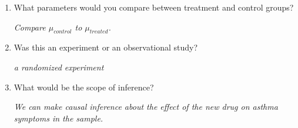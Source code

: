 \begin{enumerate}
\begin{enumerate}
    \item What parameters would you compare between treatment and
      control groups?
\begin{students}
        \vfill
\end{students}
\begin{key}
 {\it Compare $\mu_{control}$ to $\mu_{treated}$.}
\end{key}

    \item Was this  an experiment or an observational study? 
\begin{students}
        \vfill
\end{students}
\begin{key}
 {\it a randomized experiment}
\end{key}

    \item What would be the scope of inference?
 \begin{students}
        \vfill
\end{students}
\begin{key}
 {\it We can make causal inference about the effect of the new drug on
 asthma symptoms in the sample.}
\end{key}


\end{enumerate}
\end{enumerate}
